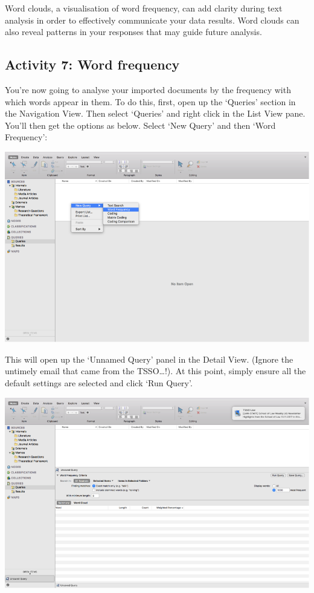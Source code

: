 \documentclass[]{book}
\theoremstyle{definition}
\theoremstyle{definition}
\theoremstyle{definition}
\theoremstyle{remark}
\begin{document}
Word clouds, a visualisation of word frequency, can add clarity during
text analysis in order to effectively communicate your data results.
Word clouds can also reveal patterns in your responses that may guide
future analysis.

\hypertarget{activity-7-word-frequency}{%
\subsection{Activity 7: Word
frequency}\label{activity-7-word-frequency}}

You're now going to analyse your imported documents by the frequency
with which words appear in them. To do this, first, open up the
`Queries' section in the Navigation View. Then select `Queries' and
right click in the List View pane. You'll then get the options as below.
Select `New Query' and then `Word Frequency':

\includegraphics{imgs/qual_21.png}

This will open up the `Unnamed Query' panel in the Detail View. (Ignore
the untimely email that came from the TSSO\ldots{}!). At this point,
simply ensure all the default settings are selected and click `Run
Query'.

\includegraphics{imgs/qual_22.png}
\end{document}
